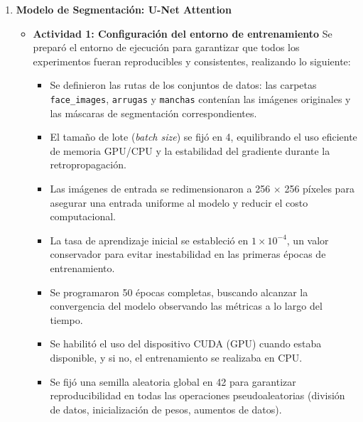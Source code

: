\begin{enumerate}
  \item \textbf{Modelo de Segmentación: U-Net Attention}
  \begin{itemize}
  \item\textbf{Actividad 1: Configuración del entorno de entrenamiento}
  Se preparó el entorno de ejecución para garantizar que todos los experimentos fueran reproducibles y consistentes, realizando lo siguiente:
\begin{itemize}
\item Se definieron las rutas de los conjuntos de datos: las carpetas \texttt{face\_images}, \texttt{arrugas} y \texttt{manchas} contenían las imágenes originales y las máscaras de segmentación correspondientes.
\item El tamaño de lote (\emph{batch size}) se fijó en 4, equilibrando el uso eficiente de memoria GPU/CPU y la estabilidad del gradiente durante la retropropagación.
\item Las imágenes de entrada se redimensionaron a 256 $\times$ 256 píxeles para asegurar una entrada uniforme al modelo y reducir el costo computacional.
\item La tasa de aprendizaje inicial se estableció en $1 \times 10^{-4}$, un valor conservador para evitar inestabilidad en las primeras épocas de entrenamiento.
\item Se programaron 50 épocas completas, buscando alcanzar la convergencia del modelo observando las métricas a lo largo del tiempo.
\item Se habilitó el uso del dispositivo CUDA (GPU) cuando estaba disponible, y si no, el entrenamiento se realizaba en CPU.
\item Se fijó una semilla aleatoria global en 42 para garantizar reproducibilidad en todas las operaciones pseudoaleatorias (división de datos, inicialización de pesos, aumentos de datos).
\end{itemize}


\end{itemize}
\end{enumerate}
